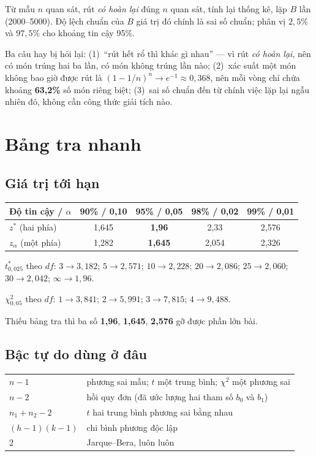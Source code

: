 \documentclass[11pt]{article}
\begin{document}
Từ mẫu $n$ quan sát, rút \emph{có hoàn lại} đúng $n$ quan sát, tính lại thống kê,
lặp $B$ lần (2000--5000). Độ lệch chuẩn của $B$ giá trị đó chính là sai số chuẩn;
phân vị $2{,}5\%$ và $97{,}5\%$ cho khoảng tin cậy 95\%.

Ba câu hay bị hỏi lại: (1)~``rút hết rổ thì khác gì nhau'' --- vì rút \emph{có hoàn
lại}, nên có món trúng hai ba lần, có món không trúng lần nào;
(2)~xác suất một món không bao giờ được rút là $(1-1/n)^n \to e^{-1} \approx 0{,}368$,
nên mỗi vòng chỉ chứa khoảng \textbf{63,2\%} số món riêng biệt;
(3)~sai số chuẩn đến từ chính việc lặp lại ngẫu nhiên đó, không cần công thức giải
tích nào.

\section{Bảng tra nhanh}

\subsection*{Giá trị tới hạn}

\begin{center}
\begin{tabular}{@{}lcccc@{}}
\toprule
\textbf{Độ tin cậy} / $\alpha$ & 90\% / 0,10 & 95\% / 0,05 & 98\% / 0,02 & 99\% / 0,01 \\
\midrule
$z^{*}$ (hai phía) & 1,645 & \textbf{1,96} & 2,33 & 2,576 \\
$z_\alpha$ (một phía) & 1,282 & \textbf{1,645} & 2,054 & 2,326 \\
\bottomrule
\end{tabular}
\end{center}

$t^{*}_{0{,}025}$ theo $df$: $3 \to 3{,}182$; $5 \to 2{,}571$; $10 \to 2{,}228$;
$20 \to 2{,}086$; $25 \to 2{,}060$; $30 \to 2{,}042$; $\infty \to 1{,}96$.

$\chi^2_{0{,}05}$ theo $df$: $1 \to 3{,}841$; $2 \to 5{,}991$; $3 \to 7{,}815$;
$4 \to 9{,}488$.

Thiếu bảng tra thì ba số \textbf{1,96}, \textbf{1,645}, \textbf{2,576} gỡ được phần
lớn bài.

\subsection*{Bậc tự do dùng ở đâu}

\begin{center}
\begin{tabular}{@{}ll@{}}
\toprule
$n-1$ & phương sai mẫu; $t$ một trung bình; $\chi^2$ một phương sai \\
$n-2$ & hồi quy đơn (đã ước lượng hai tham số $b_0$ và $b_1$) \\
$n_1+n_2-2$ & $t$ hai trung bình phương sai bằng nhau \\
$(h-1)(k-1)$ & chi bình phương độc lập \\
$2$ & Jarque--Bera, luôn luôn \\
\bottomrule
\end{tabular}
\end{center}
\end{document}
